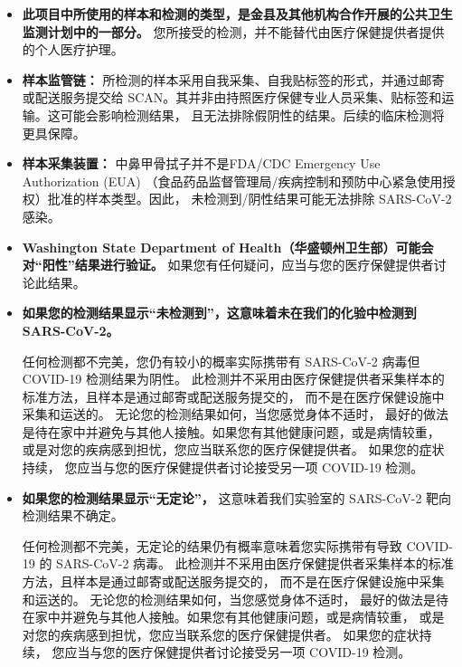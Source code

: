 \documentclass[10pt]{article}
\begin{document}
\begin{itemize}
\item

  \textbf{此项目中所使用的样本和检测的类型，是金县及其他机构合作开展的公共卫生监测计划中的一部分。}
  您所接受的检测，并不能替代由医疗保健提供者提供的个人医疗护理。

\item

  \textbf{样本监管链：} 所检测的样本采用自我采集、自我贴标签的形式，并通过邮寄或配送服务提交给
  SCAN。其并非由持照医疗保健专业人员采集、贴标签和运输。这可能会影响检测结果，
  且无法排除假阴性的结果。后续的临床检测将更具保障。

\item

  \textbf{样本采集装置：} 中鼻甲骨拭子并不是FDA/CDC Emergency Use Authorization (EUA)
  （食品药品监督管理局/疾病控制和预防中心紧急使用授权）批准的样本类型。因此，
  未检测到/阴性结果可能无法排除 SARS-CoV-2 感染。

\item

  \textbf{Washington State Department of Health（华盛顿州卫生部）可能会对``阳性''结果进行验证。}
  如果您有任何疑问，应当与您的医疗保健提供者讨论此结果。

\item{
  \textbf{如果您的检测结果显示``未检测到''，这意味着未在我们的化验中检测到 SARS-CoV-2。}

  任何检测都不完美，您仍有较小的概率实际携带有 SARS-CoV-2 病毒但 COVID-19 检测结果为阴性。
  此检测并不采用由医疗保健提供者采集样本的标准方法，且样本是通过邮寄或配送服务提交的，
  而不是在医疗保健设施中采集和运送的。 无论您的检测结果如何，当您感觉身体不适时，
  最好的做法是待在家中并避免与其他人接触。如果您有其他健康问题，或是病情较重，
  或是对您的疾病感到担忧，您应当联系您的医疗保健提供者。 如果您的症状持续，
  您应当与您的医疗保健提供者讨论接受另一项 COVID-19 检测。
}

\item

  \textbf{如果您的检测结果显示``无定论''，} 这意味着我们实验室的 SARS-CoV-2
  靶向检测结果不确定。

  任何检测都不完美，无定论的结果仍有概率意味着您实际携带有导致 COVID-19 的 SARS-CoV-2 病毒。
  此检测并不采用由医疗保健提供者采集样本的标准方法，且样本是通过邮寄或配送服务提交的，
  而不是在医疗保健设施中采集和运送的。 无论您的检测结果如何，当您感觉身体不适时，
  最好的做法是待在家中并避免与其他人接触。如果您有其他健康问题，或是病情较重，
  或是对您的疾病感到担忧，您应当联系您的医疗保健提供者。 如果您的症状持续，
  您应当与您的医疗保健提供者讨论接受另一项 COVID-19 检测。


\end{itemize}
\end{document}
